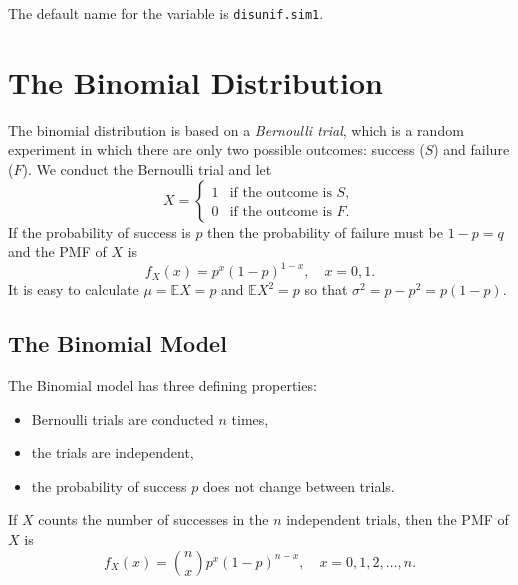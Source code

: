 The default name for the variable is \texttt{disunif.sim1}.

\section{The Binomial Distribution}
\label{sec-5-3}

The binomial distribution is based on a \emph{Bernoulli trial}, which is a
random experiment in which there are only two possible outcomes:
success (\(S\)) and failure (\(F\)). We conduct the Bernoulli trial
and let \begin{equation} X = \begin{cases} 1 & \mbox{if the outcome is $S$},\\ 0 & \mbox{if the outcome is $F$}. \end{cases} \end{equation}
If the probability of success is \(p\) then the probability of failure
must be \(1-p=q\) and the PMF of \(X\) is
\begin{equation}
f_{X}(x)=p^{x}(1-p)^{1-x},\quad x=0,1.
\end{equation}
It is easy to calculate \(\mu=\mathbb{E} X=p\) and \(\mathbb{E}
X^{2}=p\) so that \(\sigma^{2}=p-p^{2}=p(1-p)\).

\subsection{The Binomial Model}
\label{sec-5-3-1}

The Binomial model has three defining properties:
\begin{itemize}
\item Bernoulli trials are conducted \(n\) times,
\item the trials are independent,
\item the probability of success \(p\) does not change between trials.
\end{itemize}
If \(X\) counts the number of successes in the \(n\) independent
trials, then the PMF of \(X\) is 
\begin{equation}
f_{X}(x)={n \choose x}p^{x}(1-p)^{n-x},\quad x=0,1,2,\ldots,n.
\end{equation}

